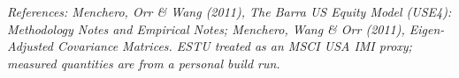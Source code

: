 \documentclass[11pt]{article}
\theoremstyle{definition}
\theoremstyle{plain}
\theoremstyle{remark}
\begin{document}
\begin{center}\small\itshape
References: Menchero, Orr \& Wang (2011), \textit{The Barra US Equity Model (USE4): Methodology Notes} and \textit{Empirical Notes}; Menchero, Wang \& Orr (2011), \textit{Eigen-Adjusted Covariance Matrices}. ESTU treated as an MSCI USA IMI proxy; measured quantities are from a personal build run.
\end{center}
\end{document}
